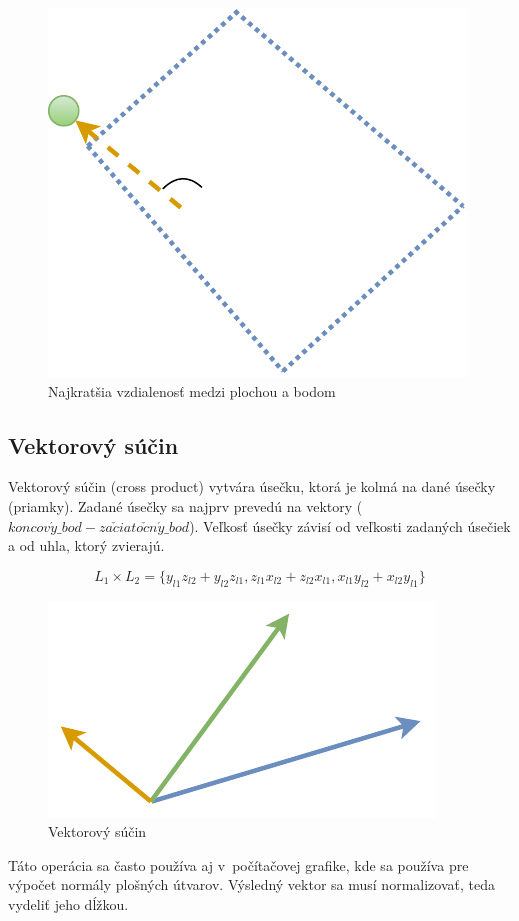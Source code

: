 \begin{figure}[H]
	\centering
	\includegraphics[height=0.3\textwidth]{obrazky-figures/Diagram/Draw/2Line/DP Navrh operacii-1D - LineMinSP.pdf}
	\caption{Najkratšia vzdialenosť medzi plochou a bodom}
	\label{fig:LineMinSP}
\end{figure}


\subsection*{Vektorový súčin}\label{subsec:crossproduct}
Vektorový súčin (cross product) vytvára úsečku, ktorá je kolmá na dané úsečky (priamky). Zadané úsečky sa najprv prevedú na vektory ($koncov\acute{y}\_bod - za\check{c}iato\check{c}n\acute{y}\_bod$).
Veľkosť úsečky závisí od veľkosti zadaných úsečiek a od uhla, ktorý zvierajú. 

\begin{equation}
 L_1 \times L_2 =  \{
 y_{l1} z_{l2} + y_{l2} z_{l1} ,
 z_{l1} x_{l2} + z_{l2} x_{l1} ,
 x_{l1} y_{l2} + x_{l2} y_{l1}\}
    \label{eq:cross}
\end{equation}


\begin{figure}[H]
	\centering
	\includegraphics[height=0.3\textwidth]{obrazky-figures/Diagram/Draw/2Line/DP Navrh operacii-1D - LineCross.pdf}
	\caption{Vektorový súčin}
	\label{fig:LineCross}
\end{figure}

Táto operácia sa často používa aj v~počítačovej grafike, kde sa používa pre výpočet normály plošných útvarov. Výsledný vektor sa musí normalizovať, teda vydeliť jeho dĺžkou.



